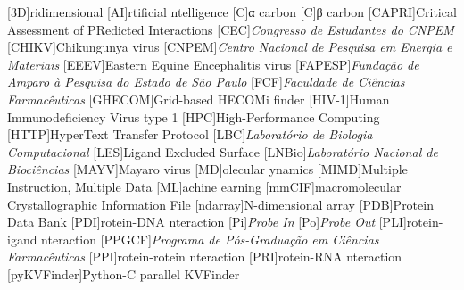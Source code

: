 \documentclass[Ingles]{phdthesis}
\begin{document}
\listoftables
\clearpage


\begin{acronym} \itemsep=-8pt
  [3D]{ridimensional}
  [AI]{rtificial ntelligence}
  [C\textalpha]{α carbon}
  [C\textbeta]{β carbon}
  [CAPRI]{Critical Assessment of PRedicted Interactions}
  [CEC]{\textit{Congresso de Estudantes do CNPEM}}
  [CHIKV]{Chikungunya virus}
  [CNPEM]{\textit{Centro Nacional de Pesquisa em Energia e Materiais}}
  [EEEV]{Eastern Equine Encephalitis virus}
  [FAPESP]{\textit{Fundação de Amparo à Pesquisa do Estado de São Paulo}}
  [FCF]{\textit{Faculdade de Ciências Farmacêuticas}}
  [GHECOM]{Grid-based HECOMi finder}
  [HIV-1]{Human Immunodeficiency Virus type 1}
  [HPC]{High-Performance Computing}
  [HTTP]{HyperText Transfer Protocol}
  [LBC]{\textit{Laboratório de Biologia Computacional}}
  [LES]{Ligand Excluded Surface}
  [LNBio]{\textit{Laboratório Nacional de Biociências}}
  [MAYV]{Mayaro virus}
  [MD]{olecular ynamics}
  [MIMD]{Multiple Instruction, Multiple Data}
  [ML]{achine earning}
  [mmCIF]{macromolecular Crystallographic Information File}
  [ndarray]{N-dimensional array}
  [PDB]{Protein Data Bank}
  [PDI]{rotein-DNA nteraction}
  [Pi]{\textit{Probe In}}
  [Po]{\textit{Probe Out}}
  [PLI]{rotein-igand nteraction}
  [PPGCF]{\textit{Programa de Pós-Graduação em Ciências Farmacêuticas}}
  [PPI]{rotein-rotein nteraction}
  [PRI]{rotein-RNA nteraction}
  [pyKVFinder]{Python-C parallel KVFinder}

\end{acronym}
\end{document}

